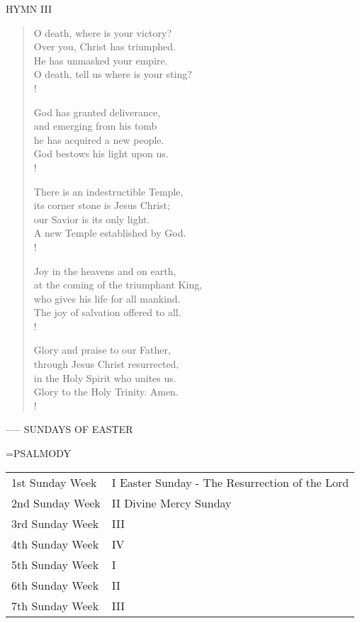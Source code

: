 \noindent\small{\uppercase{Hymn III}}\normalsize
\begin{verse}
O death, where is your victory?\\
Over you, Christ has triumphed.\\
He has unmasked your empire.\\
O death, tell us where is your sting?\\!

God has granted deliverance, \\
and emerging from his tomb\\
he has acquired a new people.\\
God bestows his light upon us.\\!

There is an indestructible Temple,\\
its corner stone is Jesus Christ;\\
our Savior is its only light.\\
A new Temple established by God.\\!

Joy in the heavens and on earth,\\
at the coming of the triumphant King,\\
who gives his life for all mankind.\\
The joy of salvation offered to all.\\!

Glory and praise to our Father,\\
through Jesus Christ resurrected,\\
in the Holy Spirit who unites us.\\
Glory to the Holy Trinity. Amen.\\!
\end{verse}
-----
SUNDAYS OF EASTER

\hangindent=\parindent \small{PSALMODY}
\begin{center}
\begin{tabular}{ l l }
1st Sunday		Week &  I	Easter Sunday - The Resurrection of the Lord\\
2nd Sunday		Week &  II	Divine Mercy Sunday\\
3rd Sunday		Week &  III\\
4th Sunday		Week &  IV\\
5th Sunday		Week &  I\\
6th Sunday		Week &  II\\
7th Sunday		Week &  III\\
\end{tabular}
\end{center}		


